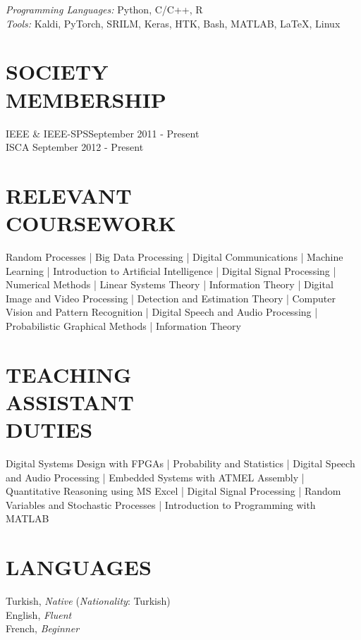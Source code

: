\documentclass[margin, 10pt]{res} %
\begin{document}
\begin{resume}
{\sl Programming Languages:} Python, C/C++, R \\
{\sl Tools:} Kaldi, PyTorch, SRILM, Keras, HTK, Bash, MATLAB, \LaTeX, Linux \\

\vspace{-.5em}
\section{SOCIETY \\ MEMBERSHIP}

IEEE \& IEEE-SPS\hfill September 2011 - Present \\
ISCA \hfill September 2012 - Present

\vspace{1em}
\section{RELEVANT \\ COURSEWORK}

Random Processes | Big Data Processing | Digital Communications | Machine Learning | Introduction to Artificial Intelligence | Digital Signal Processing | Numerical Methods | Linear Systems Theory | Information Theory | Digital Image and Video Processing | Detection and Estimation Theory | Computer Vision and Pattern Recognition | Digital Speech and Audio Processing | Probabilistic Graphical Methods | Information Theory

\vspace{1em}
\section{TEACHING \\ ASSISTANT \\DUTIES}
Digital Systems Design with FPGAs | Probability and Statistics | Digital Speech and Audio Processing | Embedded Systems with ATMEL Assembly | Quantitative Reasoning using MS Excel | Digital Signal Processing | Random Variables and Stochastic Processes | Introduction to Programming with MATLAB

\vspace{1em}
\section{LANGUAGES}
Turkish, \textit{Native} \hspace{.1em}(\textit{Nationality}: Turkish) \\
English, \textit{Fluent} \\
French, \textit{Beginner}


\end{resume}
\end{document}
